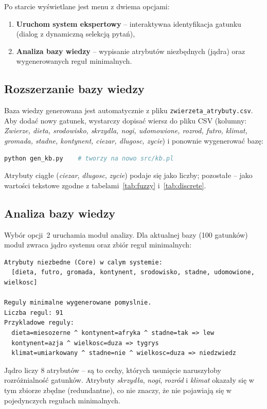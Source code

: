 \documentclass[11pt,a4paper]{article}
\newcommand{\code}[1]{\texttt{#1}}
\begin{document}
Po starcie wyświetlane jest menu z dwiema opcjami:
\begin{enumerate}[noitemsep]
    \item \textbf{Uruchom system ekspertowy} -- interaktywna identyfikacja
          gatunku (dialog z dynamiczną selekcją pytań),
    \item \textbf{Analiza bazy wiedzy} -- wypisanie atrybutów niezbędnych
          (jądra) oraz wygenerowanych reguł minimalnych.
\end{enumerate}

\subsection{Rozszerzanie bazy wiedzy}
Baza wiedzy generowana jest automatycznie z pliku
\code{zwierzeta\_atrybuty.csv}. Aby dodać nowy gatunek, wystarczy dopisać wiersz
do pliku CSV (kolumny: \textit{Zwierze, dieta, srodowisko, skrzydla, nogi,
udomowione, rozrod, futro, klimat, gromada, stadne, kontynent, ciezar, dlugosc,
zycie}) i ponownie wygenerować bazę:
\begin{lstlisting}[language=bash]
python gen_kb.py    # tworzy na nowo src/kb.pl
\end{lstlisting}
Atrybuty ciągłe (\textit{ciezar}, \textit{dlugosc}, \textit{zycie}) podaje się
jako liczby; pozostałe -- jako wartości tekstowe zgodne z tabelami~\ref{tab:fuzzy}
i~\ref{tab:discrete}.

\subsection{Analiza bazy wiedzy}
Wybór opcji~2 uruchamia moduł analizy. Dla aktualnej bazy (100 gatunków)
moduł zwraca jądro systemu oraz zbiór reguł minimalnych:
\begin{lstlisting}
Atrybuty niezbedne (Core) w calym systemie:
  [dieta, futro, gromada, kontynent, srodowisko, stadne, udomowione, wielkosc]

Reguly minimalne wygenerowane pomyslnie.
Liczba regul: 91
Przykladowe reguly:
  dieta=miesozerne ^ kontynent=afryka ^ stadne=tak => lew
  kontynent=azja ^ wielkosc=duza => tygrys
  klimat=umiarkowany ^ stadne=nie ^ wielkosc=duza => niedzwiedz
\end{lstlisting}
Jądro liczy 8 atrybutów -- są to cechy, których usunięcie naruszyłoby
rozróżnialność gatunków. Atrybuty \textit{skrzydła}, \textit{nogi},
\textit{rozród} i \textit{klimat} okazały się w tym zbiorze zbędne (redundantne),
co nie znaczy, że nie pojawiają się w pojedynczych regułach minimalnych.
\end{document}
